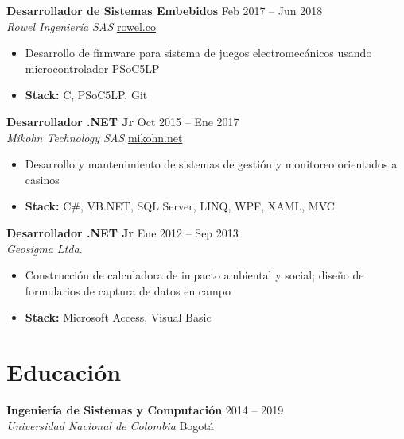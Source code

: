 \documentclass[11pt,a4paper]{article}
\begin{document}
\vspace{4pt}

\textbf{Desarrollador de Sistemas Embebidos} \hfill {\color{lighttext} Feb 2017 -- Jun 2018} \\
\textit{Rowel Ingenier\'{i}a SAS} \hfill \href{https://www.rowel.co}{rowel.co}
\begin{itemize}
    \item Desarrollo de firmware para sistema de juegos electromec\'{a}nicos usando microcontrolador PSoC5LP
    \item \textbf{Stack:} C, PSoC5LP, Git
\end{itemize}

\vspace{4pt}

\textbf{Desarrollador .NET Jr} \hfill {\color{lighttext} Oct 2015 -- Ene 2017} \\
\textit{Mikohn Technology SAS} \hfill \href{https://www.mikohn.net}{mikohn.net}
\begin{itemize}
    \item Desarrollo y mantenimiento de sistemas de gesti\'{o}n y monitoreo orientados a casinos
    \item \textbf{Stack:} C\#, VB.NET, SQL Server, LINQ, WPF, XAML, MVC
\end{itemize}

\vspace{4pt}

\textbf{Desarrollador .NET Jr} \hfill {\color{lighttext} Ene 2012 -- Sep 2013} \\
\textit{Geosigma Ltda.}
\begin{itemize}
    \item Construcci\'{o}n de calculadora de impacto ambiental y social; dise\~{n}o de formularios de captura de datos en campo
    \item \textbf{Stack:} Microsoft Access, Visual Basic
\end{itemize}

\section{Educaci\'{o}n}

\textbf{Ingenier\'{i}a de Sistemas y Computaci\'{o}n} \hfill {\color{lighttext} 2014 -- 2019} \\
\textit{Universidad Nacional de Colombia} \hfill Bogot\'{a}

\vspace{4pt}
\end{document}
